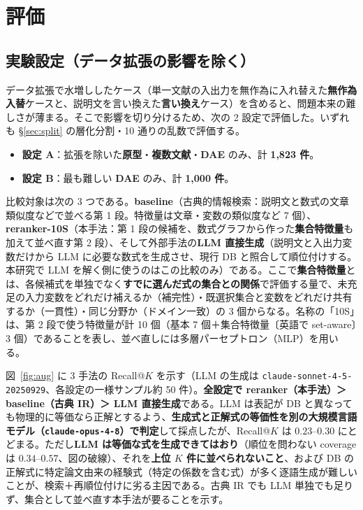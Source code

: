 \documentclass[11pt,a4paper]{ltjsarticle}
\begin{document}
\section{評価}\label{sec:eval}

\subsection{実験設定（データ拡張の影響を除く）}\label{sec:setting}
データ拡張で水増ししたケース（単一文献の入出力を無作為に入れ替えた\textbf{無作為入替}ケースと、説明文を言い換えた\textbf{言い換え}ケース）を含めると、問題本来の難しさが薄まる。そこで影響を切り分けるため、次の 2 設定で評価した。いずれも \S\ref{sec:split} の層化分割・10 通りの乱数で評価する。

\begin{itemize}[leftmargin=1.5em]
  \item \textbf{設定 A}：拡張を除いた\textbf{原型}・\textbf{複数文献}・\textbf{DAE} のみ、計 \textbf{1{,}823 件}。
  \item \textbf{設定 B}：最も難しい \textbf{DAE} のみ、計 \textbf{1{,}000 件}。
\end{itemize}

比較対象は次の 3 つである。\textbf{baseline}（古典的情報検索：説明文と数式の文章類似度などで並べる第 1 段。特徴量は文章・変数の類似度など 7 個）、\textbf{reranker-10S}（本手法：第 1 段の候補を、数式グラフから作った\textbf{集合特徴量}も加えて並べ直す第 2 段）、そして外部手法の\textbf{LLM 直接生成}（説明文と入出力変数だけから LLM に必要な数式を生成させ、現行 DB と照合して順位付けする。本研究で LLM を解く側に使うのはこの比較のみ）である。ここで\textbf{集合特徴量}とは、各候補式を単独でなく\textbf{すでに選んだ式の集合との関係}で評価する量で、未充足の入力変数をどれだけ補えるか（補完性）・既選択集合と変数をどれだけ共有するか（一貫性）・同じ分野か（ドメイン一致）の 3 個からなる。名称の「10S」は、第 2 段で使う特徴量が計 10 個（基本 7 個＋集合特徴量〔英語で set-aware〕3 個）であることを表し、並べ直しには多層パーセプトロン（MLP）を用いる。

図~\ref{fig:aug} に 3 手法の Recall@$K$ を示す（LLM の生成は \texttt{claude-sonnet-4-5-20250929}、各設定の一様サンプル約 50 件）。\textbf{全設定で reranker（本手法）＞ baseline（古典 IR）＞ LLM 直接生成}である。LLM は表記が DB と異なっても物理的に等価なら正解とするよう、\textbf{生成式と正解式の等価性を別の大規模言語モデル（\texttt{claude-opus-4-8}）で判定}して採点したが、Recall@$K$ は $0.23$–$0.30$ にとどまる。ただし\textbf{LLM は等価な式を生成できてはおり}（順位を問わない coverage は $0.34$–$0.57$、図の破線）、それを\textbf{上位 $K$ 件に並べられないこと}、および DB の正解式に特定論文由来の経験式（特定の係数を含む式）が多く逐語生成が難しいことが、検索＋再順位付けに劣る主因である。古典 IR でも LLM 単独でも足りず、集合として並べ直す本手法が要ることを示す。
\end{document}
